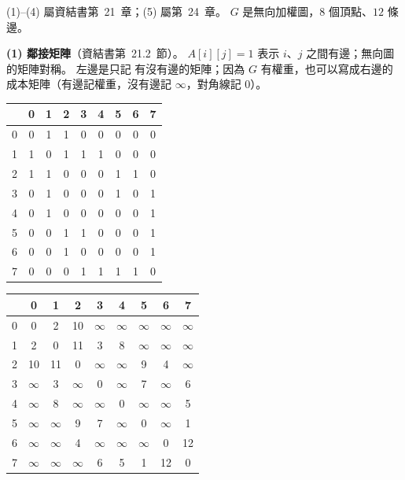 \begin{pastsoln}
(1)--(4) 屬資結書第~21~章；(5) 屬第~24~章。 $G$ 是無向加權圖，$8$ 個頂點、$12$ 條邊。

\textbf{(1) 鄰接矩陣}（資結書第~21.2~節）。 $A[i][j] = 1$ 表示 $i$、$j$ 之間有邊；無向圖的矩陣對稱。 左邊是只記
有沒有邊的矩陣；因為 $G$ 有權重，也可以寫成右邊的成本矩陣（有邊記權重，沒有邊記 $\infty$，對角線記 $0$）。
\begin{center}
\small
\begin{tabular}{c|*{8}{c}}
 & 0 & 1 & 2 & 3 & 4 & 5 & 6 & 7 \\ \hline
0 & 0 & 1 & 1 & 0 & 0 & 0 & 0 & 0 \\
1 & 1 & 0 & 1 & 1 & 1 & 0 & 0 & 0 \\
2 & 1 & 1 & 0 & 0 & 0 & 1 & 1 & 0 \\
3 & 0 & 1 & 0 & 0 & 0 & 1 & 0 & 1 \\
4 & 0 & 1 & 0 & 0 & 0 & 0 & 0 & 1 \\
5 & 0 & 0 & 1 & 1 & 0 & 0 & 0 & 1 \\
6 & 0 & 0 & 1 & 0 & 0 & 0 & 0 & 1 \\
7 & 0 & 0 & 0 & 1 & 1 & 1 & 1 & 0 \\
\end{tabular}
\qquad
\begin{tabular}{c|*{8}{c}}
 & 0 & 1 & 2 & 3 & 4 & 5 & 6 & 7 \\ \hline
0 & 0 & 2 & 10 & $\infty$ & $\infty$ & $\infty$ & $\infty$ & $\infty$ \\
1 & 2 & 0 & 11 & 3 & 8 & $\infty$ & $\infty$ & $\infty$ \\
2 & 10 & 11 & 0 & $\infty$ & $\infty$ & 9 & 4 & $\infty$ \\
3 & $\infty$ & 3 & $\infty$ & 0 & $\infty$ & 7 & $\infty$ & 6 \\
4 & $\infty$ & 8 & $\infty$ & $\infty$ & 0 & $\infty$ & $\infty$ & 5 \\
5 & $\infty$ & $\infty$ & 9 & 7 & $\infty$ & 0 & $\infty$ & 1 \\
6 & $\infty$ & $\infty$ & 4 & $\infty$ & $\infty$ & $\infty$ & 0 & 12 \\
7 & $\infty$ & $\infty$ & $\infty$ & 6 & 5 & 1 & 12 & 0 \\
\end{tabular}
\end{center}


\end{pastsoln}
